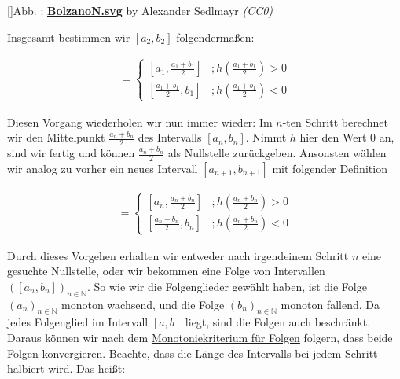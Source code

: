 \documentclass[fontsize=9pt,
               parskip=half-,
               DIV=14,
               listof=chapterentry,
               tocflat]{scrbook}
\newcounter{imagelabel}
\begin{document}
\begin{proof*}
[]{Abb. : \protect\href{https://commons.wikimedia.org/wiki/File:BolzanoN.svg}{\textbf{BolzanoN.svg}} by Alexander Sedlmayr \textit{(CC0)}}\begin{center}
\end{center}

Insgesamt bestimmen wir $[a_{2},b_{2}]$ folgendermaßen:

\begin{align*}
[a_{2},b_{2}]={\begin{cases}\left[a_{1},{\frac {a_{1}+b_{1}}{2}}\right]&;h\left({\frac {a_{1}+b_{1}}{2}}\right)>0\\\left[{\frac {a_{1}+b_{1}}{2}},b_{1}\right]&;h\left({\frac {a_{1}+b_{1}}{2}}\right)<0\end{cases}}
\end{align*}

Diesen Vorgang wiederholen wir nun immer wieder: Im $n$-ten Schritt berechnet wir den Mittelpunkt ${\tfrac {a_{n}+b_{n}}{2}}$ des Intervalls $[a_{n},b_{n}]$. Nimmt $h$ hier den Wert $0$ an, sind wir fertig und können ${\tfrac {a_{n}+b_{n}}{2}}$ als Nullstelle zurückgeben. Ansonsten wählen wir analog zu vorher ein neues Intervall $[a_{n+1},b_{n+1}]$ mit folgender Definition

\begin{align*}
[a_{n+1},b_{n+1}]={\begin{cases}\left[a_{n},{\frac {a_{n}+b_{n}}{2}}\right]&;h\left({\frac {a_{n}+b_{n}}{2}}\right)>0\\\left[{\frac {a_{n}+b_{n}}{2}},b_{n}\right]&;h\left({\frac {a_{n}+b_{n}}{2}}\right)<0\end{cases}}
\end{align*}

Durch dieses Vorgehen erhalten wir entweder nach irgendeinem Schritt $n$ eine gesuchte Nullstelle, oder wir bekommen eine Folge von Intervallen $([a_{n},b_{n}])_{n\in \mathbb {N} }$. So wie wir die Folgenglieder gewählt haben, ist die Folge $(a_{n})_{n\in \mathbb {N} }$ monoton wachsend, und die Folge $(b_{n})_{n\in \mathbb {N} }$ monoton fallend. Da jedes Folgenglied im Intervall $[a,b]$ liegt, sind die Folgen auch beschränkt. Daraus können wir nach dem \href{https://de.wikibooks.org/wiki/Mathe\_für\_Nicht-Freaks:\_Monotoniekriterium\_für\_Folgen}
{Monotoniekriterium für Folgen} folgern, dass beide Folgen konvergieren. Beachte, dass die Länge des Intervalls bei jedem Schritt halbiert wird. Das heißt:


\end{proof*}
\end{document}
